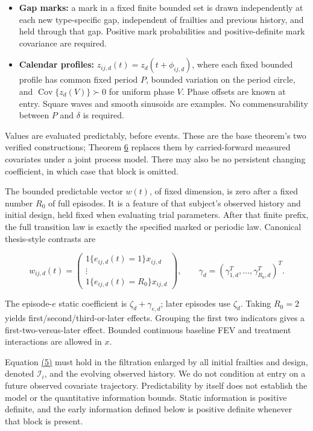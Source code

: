 \documentclass[11pt]{article}
\begin{document}
\begin{itemize}
  \item \textbf{Gap marks:} a mark in a fixed finite bounded set is drawn independently at each new type-specific gap, independent of frailties and previous history, and held through that gap. Positive mark probabilities and positive-definite mark covariance are required.
  \item \textbf{Calendar profiles:} \(z_{ij,d}(t)=z_d(t+\phi_{ij,d})\), where each fixed bounded profile has common fixed period \(P\), bounded variation on the period circle, and \(\operatorname{Cov}\{z_d(V)\}\succ0\) for uniform phase \(V\). Phase offsets are known at entry. Square waves and smooth sinusoids are examples. No commensurability between \(P\) and \(\delta\) is required.
\end{itemize}

Values are evaluated predictably, before events. These are the base theorem's two verified constructions; Theorem \hyperref[res:Theorem-6]{6} replaces them by carried-forward measured covariates under a joint process model. There may also be no persistent changing coefficient, in which case that block is omitted.

The bounded predictable vector \(w(t)\), of fixed dimension, is zero after a fixed number \(R_0\) of full episodes. It is a feature of that subject's observed history and initial design, held fixed when evaluating trial parameters. After that finite prefix, the full transition law is exactly the specified marked or periodic law. Canonical thesis-style contrasts are

\begin{equation*}
w_{ij,d}(t)=
\begin{pmatrix}
1\{e_{ij,d}(t)=1\}x_{ij,d}\\
\vdots\\
1\{e_{ij,d}(t)=R_0\}x_{ij,d}
\end{pmatrix},
\qquad
\gamma_d=(\gamma_{1,d}^T,\ldots,\gamma_{R_0,d}^T)^T .
\tag{6}\label{eq:6}
\end{equation*}

The episode-\(e\) static coefficient is \(\zeta_d+\gamma_{e,d}\); later episodes use \(\zeta_d\). Taking \(R_0=2\) yields first/second/third-or-later effects. Grouping the first two indicators gives a first-two-versus-later effect. Bounded continuous baseline FEV and treatment interactions are allowed in \(x\).

Equation \hyperref[eq:5]{(5)} must hold in the filtration enlarged by all initial frailties and design, denoted \(\mathcal I_i\), and the evolving observed history. We do not condition at entry on a future observed covariate trajectory. Predictability by itself does not establish the model or the quantitative information bounds. Static information is positive definite, and the early information defined below is positive definite whenever that block is present.
\end{document}
